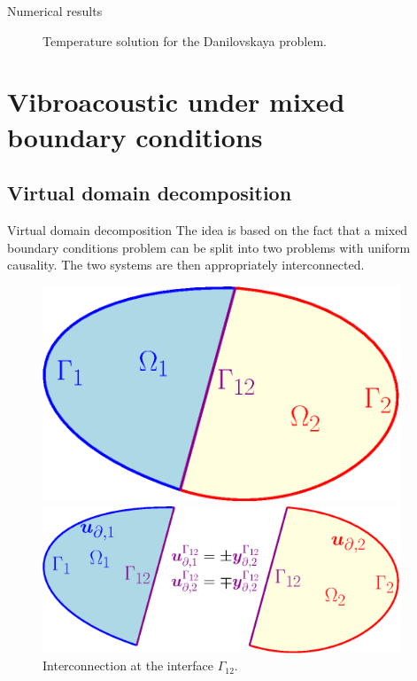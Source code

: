 \documentclass[aspectratio=169]{ISAE-Beamer}
\begin{document}
\begin{frame}{Numerical results}
{\begin{figure}
	\caption[]{Temperature solution for the Danilovskaya problem.}%
	\label{fig:theta_therElas}%
\end{figure}
}
\end{frame}

\section{Vibroacoustic under mixed boundary conditions}

\subsection{Virtual domain decomposition}

\begin{frame}{Virtual domain decomposition}
The idea is based on the fact that a mixed boundary conditions problem can be split into two problems with uniform causality. The two systems are then appropriately interconnected.

\begin{figure}[b]
	\begin{minipage}[b]{0.4\linewidth}
		\centering
		\includegraphics[width=0.95\textwidth]{part_3/pfem/dom_part.eps}
		\caption{Splitting of the domain.}
	\end{minipage}
	\hspace{0.5cm}
	\begin{minipage}[b]{0.55\linewidth}
		\centering
		\includegraphics[width=0.95\textwidth]{part_3/pfem/dom_part_int.eps}
		\caption{Interconnection at the interface $\Gamma_{12}$.}
	\end{minipage}
\end{figure}

\end{frame}
\end{document}
